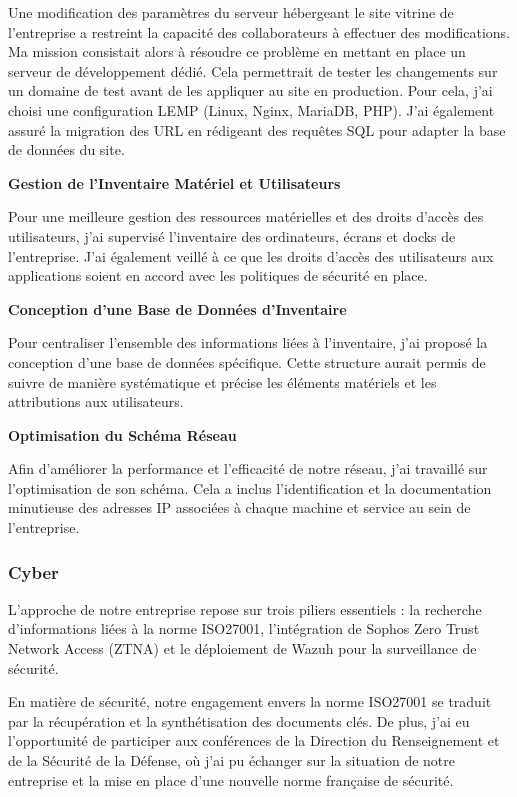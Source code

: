Une modification des paramètres du serveur hébergeant le site vitrine de l'entreprise a restreint la capacité des collaborateurs à effectuer des modifications.
Ma mission consistait alors à résoudre ce problème en mettant en place un serveur de développement dédié.
Cela permettrait de tester les changements sur un domaine de test avant de les appliquer au site en production.
Pour cela, j'ai choisi une configuration LEMP (Linux, Nginx, MariaDB, PHP).
J'ai également assuré la migration des URL en rédigeant des requêtes SQL pour adapter la base de données du site.

\textbf{Gestion de l'Inventaire Matériel et Utilisateurs}

Pour une meilleure gestion des ressources matérielles et des droits d'accès des utilisateurs, j'ai supervisé l'inventaire des ordinateurs, écrans et docks de l'entreprise.
J'ai également veillé à ce que les droits d'accès des utilisateurs aux applications soient en accord avec les politiques de sécurité en place.

\textbf{Conception d'une Base de Données d'Inventaire}

Pour centraliser l'ensemble des informations liées à l'inventaire, j'ai proposé la conception d'une base de données spécifique.
Cette structure aurait permis de suivre de manière systématique et précise les éléments matériels et les attributions aux utilisateurs.

\textbf{Optimisation du Schéma Réseau}

Afin d'améliorer la performance et l'efficacité de notre réseau, j'ai travaillé sur l'optimisation de son schéma.
Cela a inclus l'identification et la documentation minutieuse des adresses IP associées à chaque machine et service au sein de l'entreprise.

\subsubsection{Cyber}
L'approche de notre entreprise repose sur trois piliers essentiels : la recherche d'informations liées à la norme ISO27001, l'intégration de Sophos Zero Trust Network Access (ZTNA) et le déploiement de Wazuh pour la surveillance de sécurité.

En matière de sécurité, notre engagement envers la norme ISO27001 se traduit par la récupération et la synthétisation des documents clés.
De plus, j'ai eu l'opportunité de participer aux conférences de la Direction du Renseignement et de la Sécurité de la Défense, où j'ai pu échanger sur la situation de notre entreprise et la mise en place d'une nouvelle norme française de sécurité.

